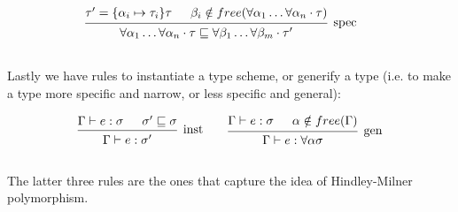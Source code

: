 \begin{appendices}
  \[\begin{array}{c@{\qquad}c}  
      \mbox{\begin{prooftree}
        \hypo{\tau' = \{\alpha_i \mapsto \tau_i\}\tau}
        \hypo{\beta_i \notin free(\forall \alpha_1 \ldots \forall
          \alpha_n \cdot \tau)}
        \infer2[spec]{\forall \alpha_1 \ldots \forall \alpha_n \cdot
          \tau \sqsubseteq \forall \beta_1 \ldots \forall
          \beta_m \cdot \tau' }
      \end{prooftree}}
      \\\\
  \end{array} \]  
    
  Lastly we have rules to instantiate a type scheme, or generify a
  type (i.e. to make a type more specific and narrow, or less specific
  and general):
  
  \[\begin{array}{c@{\qquad}c}  
      \mbox{\begin{prooftree}
        \hypo{\Gamma \vdash e : \sigma}
        \hypo{\sigma' \sqsubseteq \sigma}
        \infer2[inst]{\Gamma \vdash e : \sigma'}
      \end{prooftree}}
      &
      \mbox{\begin{prooftree}
        \hypo{\Gamma \vdash e : \sigma}
        \hypo{\alpha \notin free(\Gamma)}
        \infer2[gen]{\Gamma \vdash e : \forall \alpha \sigma}
      \end{prooftree}}
      \\\\
  \end{array} \]

  The latter three rules are the ones that capture the idea of
  Hindley-Milner polymorphism.
  
\end{appendices}
